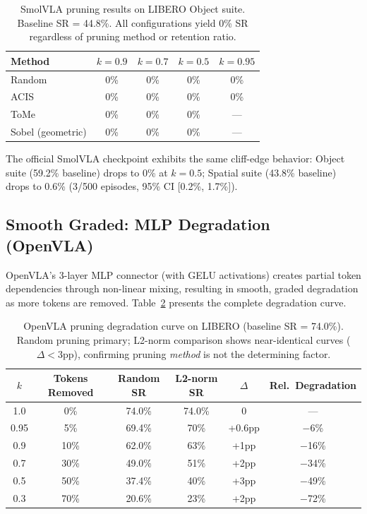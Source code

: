 \documentclass[letterpaper]{article}
\begin{document}
\begin{table}[t]
\centering
\caption{SmolVLA pruning results on LIBERO Object suite. Baseline SR = 44.8\%. All configurations yield 0\% SR regardless of pruning method or retention ratio.}
\label{tab:smolvla_cliff}
\small
\begin{tabular}{@{}lcccc@{}}
\toprule
\textbf{Method} & $k{=}0.9$ & $k{=}0.7$ & $k{=}0.5$ & $k{=}0.95$ \\
\midrule
Random       & 0\% & 0\% & 0\% & 0\% \\
ACIS         & 0\% & 0\% & 0\% & 0\% \\
ToMe         & 0\% & 0\% & 0\% & --- \\
Sobel (geometric) & 0\% & 0\% & 0\% & --- \\
\bottomrule
\end{tabular}
\end{table}

The official SmolVLA checkpoint exhibits the same cliff-edge behavior: Object suite (59.2\% baseline) drops to 0\% at $k{=}0.5$; Spatial suite (43.8\% baseline) drops to 0.6\% (3/500 episodes, 95\% CI [0.2\%, 1.7\%]).

\subsection{Smooth Graded: MLP Degradation (OpenVLA)}

OpenVLA's 3-layer MLP connector (with GELU activations) creates partial token dependencies through non-linear mixing, resulting in smooth, graded degradation as more tokens are removed. Table~\ref{tab:openvla_curve} presents the complete degradation curve.

\begin{table}[t]
\centering
\caption{OpenVLA pruning degradation curve on LIBERO (baseline SR = 74.0\%). Random pruning primary; L2-norm comparison shows near-identical curves ($\Delta < 3$pp), confirming pruning \emph{method} is not the determining factor.}
\label{tab:openvla_curve}
\small
\begin{tabular}{@{}cccccc@{}}
\toprule
$k$ & \textbf{Tokens Removed} & \textbf{Random SR} & \textbf{L2-norm SR} & \textbf{$\Delta$} & \textbf{Rel.\ Degradation} \\
\midrule
1.0  & 0\%  & 74.0\% & 74.0\% & 0    & --- \\
0.95 & 5\%  & 69.4\% & 70\%   & +0.6pp & $-$6\% \\
0.9  & 10\% & 62.0\% & 63\%   & +1pp   & $-$16\% \\
0.7  & 30\% & 49.0\% & 51\%   & +2pp   & $-$34\% \\
0.5  & 50\% & 37.4\% & 40\%   & +3pp   & $-$49\% \\
0.3  & 70\% & 20.6\% & 23\%   & +2pp   & $-$72\% \\
\bottomrule
\end{tabular}
\end{table}
\end{document}
